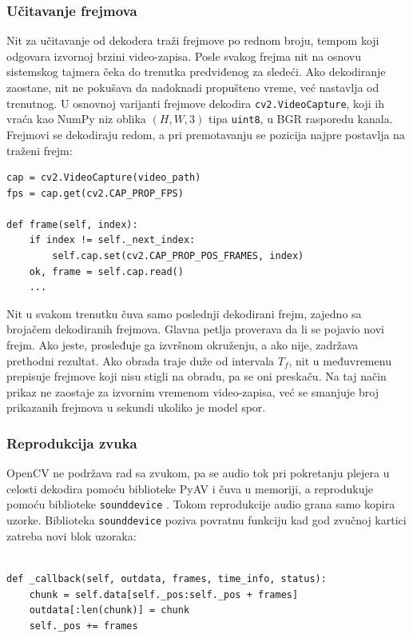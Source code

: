 \documentclass[12pt,a4paper]{article}
\begin{document}
\subsubsection{Učitavanje frejmova}

Nit za učitavanje od dekodera traži frejmove po rednom broju, tempom koji odgovara izvornoj brzini video-zapisa. Posle svakog frejma nit na osnovu sistemskog tajmera čeka do trenutka predviđenog za sledeći. Ako dekodiranje zaostane, nit ne pokušava da nadoknadi propušteno vreme, već nastavlja od trenutnog. U osnovnoj varijanti frejmove dekodira \texttt{cv2.VideoCapture}, koji ih vraća kao NumPy niz oblika $(H,W,3)$ tipa \texttt{uint8}, u BGR rasporedu kanala. Frejmovi se dekodiraju redom, a pri premotavanju se pozicija najpre postavlja na traženi frejm:

\begin{verbatim}
cap = cv2.VideoCapture(video_path)
fps = cap.get(cv2.CAP_PROP_FPS)

def frame(self, index):
    if index != self._next_index:
        self.cap.set(cv2.CAP_PROP_POS_FRAMES, index)
    ok, frame = self.cap.read()
    ...
\end{verbatim}

Nit u svakom trenutku čuva samo poslednji dekodirani frejm, zajedno sa brojačem dekodiranih frejmova. Glavna petlja proverava da li se pojavio novi frejm. Ako jeste, prosleđuje ga izvršnom okruženju, a ako nije, zadržava prethodni rezultat. Ako obrada traje duže od intervala $T_f$, nit u međuvremenu prepisuje frejmove koji nisu stigli na obradu, pa se oni preskaču. Na taj način prikaz ne zaostaje za izvornim vremenom video-zapisa, već se smanjuje broj prikazanih frejmova u sekundi ukoliko je model spor.

\subsubsection{Reprodukcija zvuka}

OpenCV ne podržava rad sa zvukom, pa se audio tok pri pokretanju plejera u celosti dekodira pomoću biblioteke PyAV \cite{PyAV} i čuva u memoriji, a reprodukuje pomoću biblioteke \texttt{sounddevice} \cite{sounddevice}. Tokom reprodukcije audio grana samo kopira uzorke. Biblioteka \texttt{sounddevice} poziva povratnu funkciju kad god zvučnoj kartici zatreba novi blok uzoraka:
\\
\\
\begin{verbatim}
def _callback(self, outdata, frames, time_info, status):
    chunk = self.data[self._pos:self._pos + frames]
    outdata[:len(chunk)] = chunk
    self._pos += frames
\end{verbatim}
\end{document}
